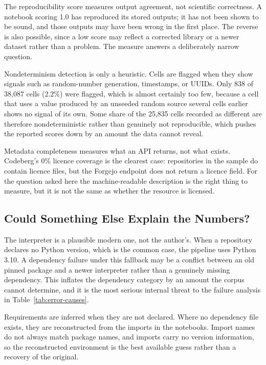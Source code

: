 The reproducibility score measures output agreement, not scientific correctness. A notebook scoring 1.0 has reproduced its stored outputs; it has not been shown to be sound, and those outputs may have been wrong in the first place. The reverse is also possible, since a low score may reflect a corrected library or a newer dataset rather than a problem. The measure answers a deliberately narrow question.

Nondeterminism detection is only a heuristic. Cells are flagged when they show signals such as random-number generation, timestamps, or UUIDs. Only 838 of 38{,}087 cells (2.2\%) were flagged, which is almost certainly too few, because a cell that uses a value produced by an unseeded random source several cells earlier shows no signal of its own. Some share of the 25{,}835 cells recorded as different are therefore nondeterministic rather than genuinely not reproducible, which pushes the reported scores down by an amount the data cannot reveal.

Metadata completeness measures what an API returns, not what exists. Codeberg's 0\% licence coverage is the clearest case: repositories in the sample do contain licence files, but the Forgejo endpoint does not return a licence field. For the question asked here the machine-readable description is the right thing to measure, but it is not the same as whether the resource is licensed.

\subsection{Could Something Else Explain the Numbers?}

The interpreter is a plausible modern one, not the author's. When a repository declares no Python version, which is the common case, the pipeline uses Python 3.10. A dependency failure under this fallback may be a conflict between an old pinned package and a newer interpreter rather than a genuinely missing dependency. This inflates the dependency category by an amount the corpus cannot determine, and it is the most serious internal threat to the failure analysis in Table~\ref{tab:error-causes}.

Requirements are inferred when they are not declared. Where no dependency file exists, they are reconstructed from the imports in the notebooks. Import names do not always match package names, and imports carry no version information, so the reconstructed environment is the best available guess rather than a recovery of the original.

